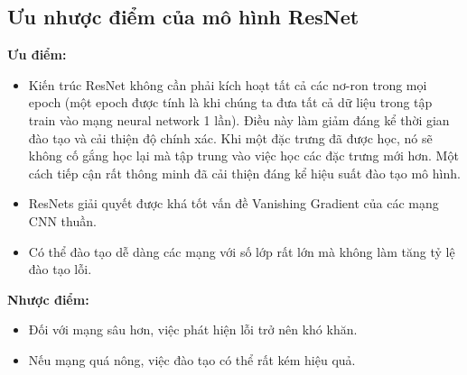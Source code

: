 \subsection{Ưu nhược điểm của mô hình ResNet}
\textbf{Ưu điểm:}
\begin{itemize}
	\item Kiến trúc ResNet không cần phải kích hoạt tất cả các nơ-ron trong mọi epoch (một epoch được tính là khi chúng ta đưa tất cả dữ liệu trong tập train vào mạng neural network 1 lần). Điều này làm giảm đáng kể thời gian đào tạo và cải thiện độ chính xác. Khi một đặc trưng đã được học, nó sẽ không cố gắng học lại mà tập trung vào việc học các đặc trưng mới hơn. Một cách tiếp cận rất thông minh đã cải thiện đáng kể hiệu suất đào tạo mô hình.
	\item ResNets giải quyết được khá tốt vấn đề Vanishing Gradient của các mạng CNN thuần.
	\item Có thể đào tạo dễ dàng các mạng với số lớp rất lớn mà không làm tăng tỷ lệ đào tạo lỗi.
\end{itemize}
\textbf{Nhược điểm: \cite{resnet_disadvantage}}
\begin{itemize}
	\item Đối với mạng sâu hơn, việc phát hiện lỗi trở nên khó khăn.
	\item Nếu mạng quá nông, việc đào tạo có thể rất kém hiệu quả.
\end{itemize}
